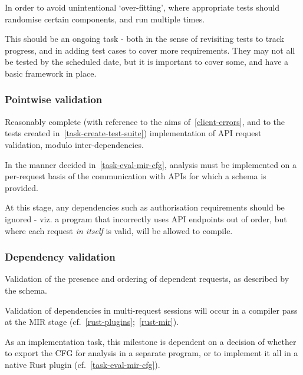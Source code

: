 In order to avoid unintentional `over-fitting', where appropriate tests should randomise certain components, and run multiple times.

This should be an ongoing task - both in the sense of revisiting tests to track progress, and in adding test cases to cover more requirements. They may not all be tested by the scheduled date, but it is important to cover some, and have a basic framework in place.

\subsubsection{Pointwise validation}
Reasonably complete (with reference to the aims of~\ref{client-errors}, and to the tests created in~\ref{task-create-test-suite}) implementation of API request validation, modulo inter-dependencies.
\begin{task}
\end{task}

In the manner decided in~\ref{task-eval-mir-cfg}, analysis must be implemented on a per-request basis of the communication with APIs for which a schema is provided.

At this stage, any dependencies such as authorisation requirements should be ignored - viz. a program that incorrectly uses API endpoints out of order, but where each request \emph{in itself} is valid, will be allowed to compile.

\subsubsection{Dependency validation}
Validation of the presence and ordering of dependent requests, as described by the schema.
\begin{task}
\end{task}

Validation of dependencies in multi-request sessions will occur in a compiler pass at the MIR stage (cf.~\ref{rust-plugins};~\ref{rust-mir}).

As an implementation task, this milestone is dependent on a decision of whether to export the CFG for analysis in a separate program, or to implement it all in a native Rust plugin (cf.~\ref{task-eval-mir-cfg}).

